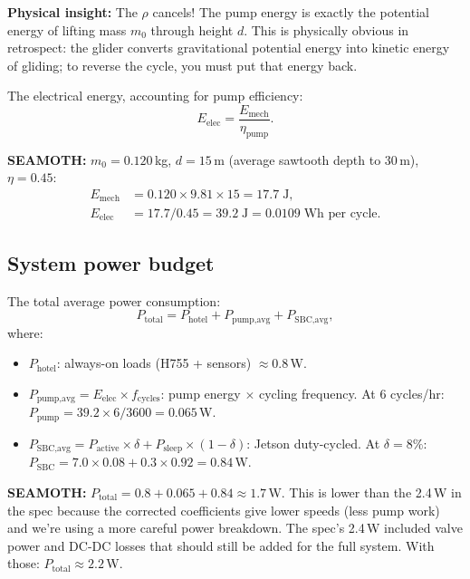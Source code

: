 \documentclass[11pt,a4paper]{article}
\newcommand{\note}[1]{\par\smallskip\noindent\colorbox{blue!8}{\parbox{\dimexpr\linewidth-2\fboxsep}{%
  \small\textbf{SEAMOTH:} #1}}\smallskip}
\newcommand{\insight}[1]{\par\smallskip\noindent\colorbox{green!8}{\parbox{\dimexpr\linewidth-2\fboxsep}{%
  \small\textbf{Physical insight:} #1}}\smallskip}
\begin{document}
\insight{The $\rho$ cancels!  The pump energy is exactly the potential energy of
lifting mass $m_0$ through height $d$.  This is physically obvious in retrospect:
the glider converts gravitational potential energy into kinetic energy of gliding;
to reverse the cycle, you must put that energy back.}

The electrical energy, accounting for pump efficiency:
\begin{equation}
  E_\text{elec} = \frac{E_\text{mech}}{\eta_\text{pump}}.
  \label{eq:Eelec}
\end{equation}

\note{$m_0=0.120$\,kg, $d=15$\,m (average sawtooth depth to 30\,m),
$\eta=0.45$:
\begin{align*}
  E_\text{mech} &= 0.120\times9.81\times15 = 17.7\;\text{J}, \\
  E_\text{elec} &= 17.7/0.45 = 39.2\;\text{J} = 0.0109\;\text{Wh per cycle}.
\end{align*}}

\subsection{System power budget}

The total average power consumption:
\begin{equation}
  P_\text{total} = P_\text{hotel} + P_\text{pump,avg} + P_\text{SBC,avg},
  \label{eq:Ptotal}
\end{equation}
where:
\begin{itemize}[nosep]
  \item $P_\text{hotel}$: always-on loads (H755 + sensors) $\approx 0.8$\,W.
  \item $P_\text{pump,avg} = E_\text{elec}\times f_\text{cycles}$: pump energy $\times$
    cycling frequency.  At 6 cycles/hr: $P_\text{pump}=39.2\times6/3600=0.065$\,W.
  \item $P_\text{SBC,avg} = P_\text{active}\times\delta + P_\text{sleep}\times(1-\delta)$:
    Jetson duty-cycled.  At $\delta=8\%$: $P_\text{SBC}=7.0\times0.08+0.3\times0.92=0.84$\,W.
\end{itemize}

\note{$P_\text{total} = 0.8 + 0.065 + 0.84 \approx 1.7$\,W.  This is lower than the
2.4\,W in the spec because the corrected coefficients give lower speeds (less pump work)
and we're using a more careful power breakdown.  The spec's 2.4\,W included valve power
and DC-DC losses that should still be added for the full system.  With those:
$P_\text{total}\approx2.2$\,W.}
\end{document}
